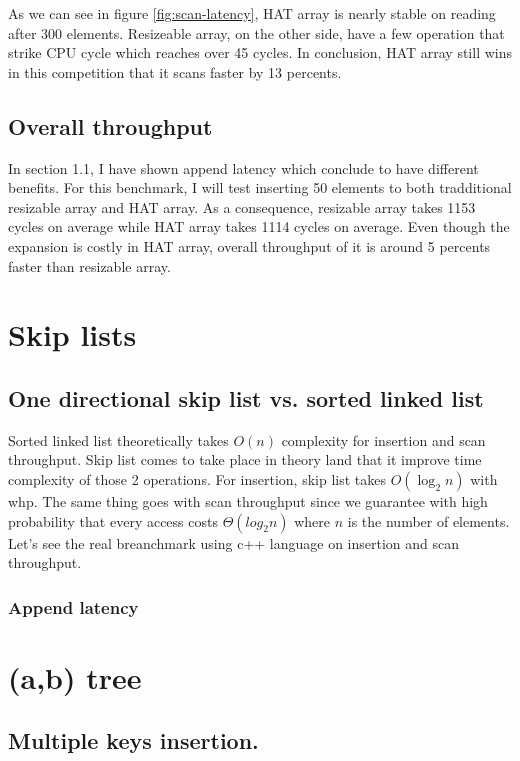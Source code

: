 \documentclass[a4paper, 12pt]{report}
\begin{document}
As we can see in figure \ref{fig:scan-latency}, HAT array is nearly stable on reading after 300 elements.
Resizeable array, on the other side, have a few operation that strike CPU cycle which reaches over 45 cycles.
In conclusion, HAT array still wins in this competition that it scans faster by 13 percents.

\section{Overall throughput}

In section 1.1, I have shown append latency which conclude to have different benefits.
For this benchmark, I will test inserting 50 elements to both tradditional resizable array and
HAT array. As a consequence, resizable array takes 1153 cycles on average while HAT array takes
1114 cycles on average. Even though the expansion is costly in HAT array, overall throughput
of it is around 5 percents faster than resizable array.


\chapter{Skip lists}

\section{One directional skip list vs. sorted linked list}

Sorted linked list theoretically takes $O(n)$ complexity for insertion and scan throughput. 
Skip list comes to take place in theory land that it improve time complexity of those 2 operations.
For insertion, skip list takes $O(\log_2 n)$ with whp. The same thing goes with scan throughput since
we guarantee with high probability that every access costs $\Theta(log_2 n)$ where $n$ is the number of elements.
Let's see the real breanchmark using c++ language on insertion and scan throughput.


\subsection{Append latency}

\chapter{(a,b) tree}

\section{Multiple keys insertion.}
\end{document}
